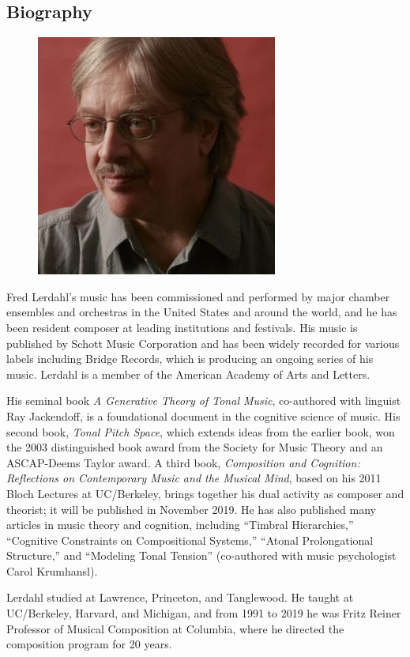 \subsection*{Biography}
\begin{figure}
\centering
\includegraphics[width=1\linewidth] {images/lerdahl.jpg}
\end{figure}

Fred Lerdahl's music has been commissioned and performed by major chamber ensembles and orchestras in the United States and around the world, and he has been resident composer at leading institutions and festivals. His music is published by Schott Music Corporation and has been widely recorded for various labels including Bridge Records, which is producing an ongoing series of his music. Lerdahl is a member of the American Academy of Arts and Letters.

His seminal book {\it A Generative Theory of Tonal Music}, co-authored with linguist Ray Jackendoff, is a foundational document in the cognitive science of music. His second book, {\it Tonal Pitch Space}, which extends ideas from the earlier book, won the 2003 distinguished book award from the Society for Music Theory and an ASCAP-Deems Taylor award. A third book, {\it Composition and Cognition: Reflections on Contemporary Music and the Musical Mind}, based on his 2011 Bloch Lectures at UC/Berkeley, brings together his dual activity as composer and theorist; it will be published in November 2019. He has also published many articles in music theory and cognition, including ``Timbral Hierarchies,'' ``Cognitive Constraints on Compositional Systems,'' ``Atonal Prolongational Structure,'' and ``Modeling Tonal Tension'' (co-authored with music psychologist Carol Krumhansl).

Lerdahl studied at Lawrence, Princeton, and Tanglewood. He taught at UC/Berkeley, Harvard, and Michigan, and from 1991 to 2019 he was Fritz Reiner Professor of Musical Composition at Columbia, where he directed the composition program for 20 years.
